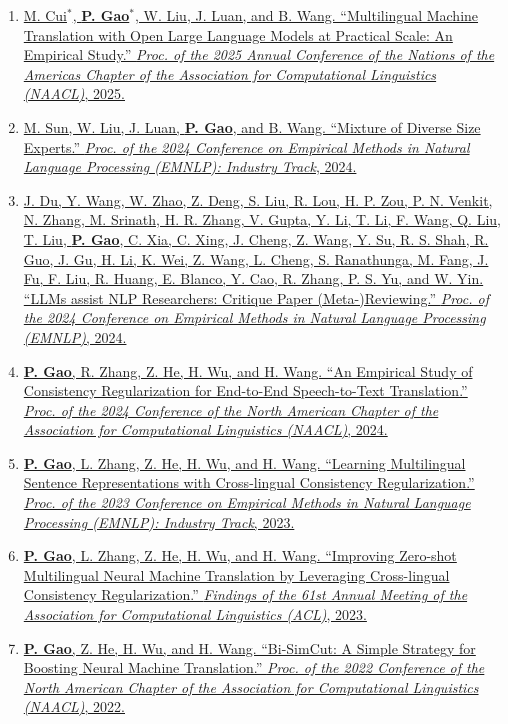 \documentclass[10pt]{article}
\makeatletter
\newlength{\bibhang}
\newlength{\bibsep}
 {\@listi \global\bibsep\itemsep \global\advance\bibsep by\parsep}
\newenvironment{bibsection}%
        {\begin{enumerate}{}{%
       \setlength{\leftmargin}{\bibhang}%
       \setlength{\itemindent}{-\leftmargin}%
       \setlength{\itemsep}{\bibsep}%
       \setlength{\parsep}{\z@}%
        \setlength{\partopsep}{0pt}%
        \setlength{\topsep}{0pt}}}
        {\end{enumerate}\vspace{-.6\baselineskip}}
\makeatother
\begin{document}
\begin{bibsection}
\item \href{}{M. Cui$^*$, {\bf P. Gao}$^*$, W. Liu, J. Luan, and B. Wang. ``Multilingual Machine Translation with Open Large Language Models at Practical Scale: An Empirical Study.'' \emph{Proc. of the 2025 Annual Conference of the Nations of the Americas Chapter of the Association for Computational Linguistics (NAACL)}, 2025.}

\item \href{}{M. Sun, W. Liu, J. Luan, {\bf P. Gao}, and B. Wang. ``Mixture of Diverse Size Experts.'' \emph{Proc. of the 2024 Conference on Empirical Methods in Natural Language Processing (EMNLP): Industry Track}, 2024.}

\item \href{}{J. Du, Y. Wang, W. Zhao, Z. Deng, S. Liu, R. Lou, H. P. Zou, P. N. Venkit, N. Zhang, M. Srinath, H. R. Zhang, V. Gupta, Y. Li, T. Li, F. Wang, Q. Liu, T. Liu, {\bf P. Gao}, C. Xia, C. Xing, J. Cheng, Z. Wang, Y. Su, R. S. Shah, R. Guo, J. Gu, H. Li, K. Wei, Z. Wang, L. Cheng, S. Ranathunga, M. Fang, J. Fu, F. Liu, R. Huang, E. Blanco, Y. Cao, R. Zhang, P. S. Yu, and W. Yin. ``LLMs assist NLP Researchers: Critique Paper (Meta-)Reviewing.'' \emph{Proc. of the 2024 Conference on Empirical Methods in Natural Language Processing (EMNLP)}, 2024.}

\item \href{}{{\bf P. Gao}, R. Zhang, Z. He, H. Wu, and H. Wang. ``An Empirical Study of Consistency Regularization for End-to-End Speech-to-Text Translation.'' \emph{Proc. of the 2024 Conference of the North American Chapter of the Association for Computational Linguistics (NAACL)}, 2024.}

\item \href{}{{\bf P. Gao}, L. Zhang, Z. He, H. Wu, and H. Wang. ``Learning Multilingual Sentence Representations with Cross-lingual Consistency Regularization.'' \emph{Proc. of the 2023 Conference on Empirical Methods in Natural Language Processing (EMNLP): Industry Track}, 2023.}

\item \href{}{{\bf P. Gao}, L. Zhang, Z. He, H. Wu, and H. Wang. ``Improving Zero-shot Multilingual Neural Machine Translation by Leveraging Cross-lingual Consistency Regularization.'' \emph{Findings of the 61st Annual Meeting of the Association for Computational Linguistics (ACL)}, 2023.}

\item \href{}{{\bf P. Gao}, Z. He, H. Wu, and H. Wang. ``Bi-SimCut: A Simple Strategy for Boosting Neural Machine Translation.'' \emph{Proc. of the 2022 Conference of the North American Chapter of the Association for Computational Linguistics (NAACL)}, 2022.}


\end{bibsection}
\end{document}
